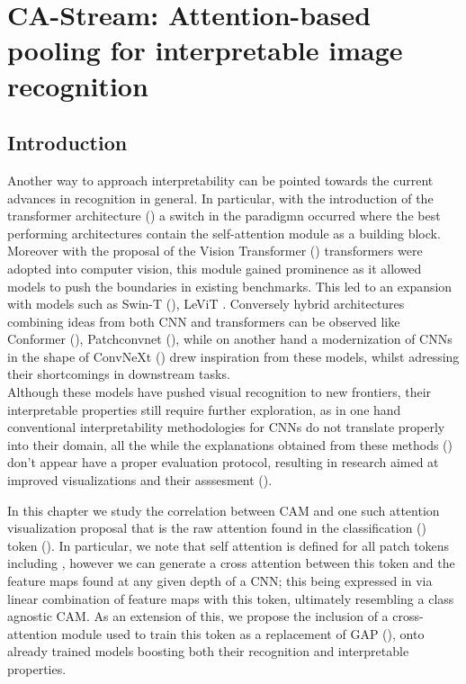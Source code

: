 \chapter{CA-Stream: Attention-based pooling for interpretable image recognition}
\chaptertoc{}
\section{Introduction}
\label{sec:intro}
\noindent Another way to approach interpretability can be pointed towards the current advances in recognition 
in general. In particular, with the introduction of the transformer architecture (\cite{vaswani2017attention})
 a switch in the paradigmn occurred where the best performing architectures contain the self-attention 
module as a building block. Moreover with the proposal of the Vision Transformer 
(\cite{dosovitskiy2020image}) transformers were adopted into computer vision, this module gained 
prominence as it allowed models to push the boundaries in existing benchmarks. This led to an 
expansion with models such as Swin-T (\citep{liu2021swin}), LeViT \cite{graham2021levit}. Conversely
hybrid architectures combining ideas from both CNN and transformers can be observed 
like Conformer (\cite{peng2021conformer}), Patchconvnet (\cite{touvron2021augmenting}),
while on another hand a modernization of CNNs in the shape of ConvNeXt (\cite{liu2022convnet}) drew 
inspiration from these models, whilst adressing their shortcomings in downstream tasks.\\

\noindent Although these models have pushed visual recognition to new frontiers, their interpretable
 properties still require further exploration, as in one hand conventional interpretability 
methodologies for CNNs do not translate properly into their domain, all the while the explanations 
obtained from these methods (\cite{abnar2020quantifying}) don't appear have a proper evaluation 
protocol, resulting in research aimed at improved visualizations and their asssesment 
(\cite{chefer2021transformer}).

\noindent In this chapter we study the correlation between CAM and one such attention visualization 
proposal that is the raw attention found in the classification (\cls) token (\cite{devlin2018bert}).
In particular, we note that self attention is defined for all patch tokens including \cls, however 
we can generate a cross attention between this token and the feature maps found at any given depth 
of a CNN; this being expressed in via linear combination of feature maps with this token, ultimately 
resembling a class agnostic CAM. As an extension of this, we propose the inclusion of a 
cross-attention module used to train this token as a replacement of GAP (\cite{lin2013network}), 
onto already trained models boosting  both their recognition and interpretable properties.



